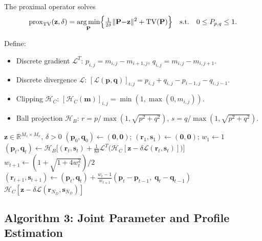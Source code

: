 \documentclass[11pt,a4paper]{article}
\newcommand{\R}{\mathbb{R}}
\newcommand{\TV}{\mathrm{TV}}
\DeclareMathOperator*{\argmin}{arg\,min}
\begin{document}
The proximal operator solves
\begin{equation}
  \mathrm{prox}_{\TV}(\mathbf{z},\delta)
  =\argmin_{\mathbf{P}}\Bigl\{
  \tfrac{1}{2\delta}\|\mathbf{P}{-}\mathbf{z}\|^2
  +\TV(\mathbf{P})\Bigr\}
  \quad\text{s.t.}\quad 0\le P_{p,q}\le 1.
  \label{eq:prox}
\end{equation}

Define:
\begin{itemize}
  \item Discrete gradient $\mathcal{L}^T$:
    $p_{i,j}=m_{i,j}{-}m_{i+1,j}$,\;
    $q_{i,j}=m_{i,j}{-}m_{i,j+1}$.
  \item Discrete divergence $\mathcal{L}$:
    $[\mathcal{L}(\mathbf{p},\mathbf{q})]_{i,j}
    =p_{i,j}{+}q_{i,j}{-}p_{i-1,j}{-}q_{i,j-1}$.
  \item Clipping $\mathcal{H}_C$:
    $[\mathcal{H}_C(\mathbf{m})]_{i,j}
    =\min(1,\max(0,m_{i,j}))$.
  \item Ball projection $\mathcal{H}_B$:
    $r=p/\max(1,\sqrt{p^2{+}q^2})$,\;
    $s=q/\max(1,\sqrt{p^2{+}q^2})$.
\end{itemize}

\begin{algorithm}[H]
\caption{TV denoising: $\mathrm{prox}_{\TV}(\mathbf{z},\delta)$}
\label{alg:tv}
\begin{algorithmic}[1]
\Require $\mathbf{z}\in\R^{M_z\times M_x}$, $\delta>0$
\State $(\mathbf{p}_0,\mathbf{q}_0)\leftarrow(\mathbf{0},\mathbf{0})$;\;
$(\mathbf{r}_1,\mathbf{s}_1)\leftarrow(\mathbf{0},\mathbf{0})$;\;
$w_1\leftarrow 1$
  \State $(\mathbf{p}_t,\mathbf{q}_t)\leftarrow
    \mathcal{H}_B\!\bigl[(\mathbf{r}_t,\mathbf{s}_t)
    +\tfrac{1}{8\delta}\mathcal{L}^T\!\bigl(
    \mathcal{H}_C[\mathbf{z}{-}\delta
    \mathcal{L}(\mathbf{r}_t,\mathbf{s}_t)]\bigr)\bigr]$
  \State $w_{t+1}\leftarrow(1{+}\sqrt{1{+}4w_t^2})/2$
  \State $(\mathbf{r}_{t+1},\mathbf{s}_{t+1})\leftarrow
    (\mathbf{p}_t,\mathbf{q}_t)
    +\tfrac{w_t{-}1}{w_{t+1}}
    (\mathbf{p}_t{-}\mathbf{p}_{t-1},\;
    \mathbf{q}_t{-}\mathbf{q}_{t-1})$
\EndFor
\State \Return
$\mathcal{H}_C[\mathbf{z}{-}\delta
\mathcal{L}(\mathbf{r}_{N_D},\mathbf{s}_{N_D})]$
\end{algorithmic}
\end{algorithm}

\subsection{Algorithm 3: Joint Parameter and Profile Estimation}
\end{document}
